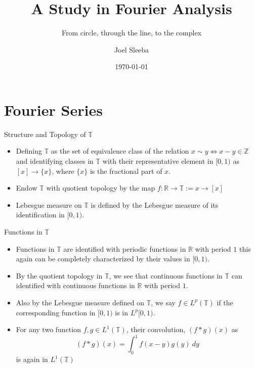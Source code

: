 \documentclass[compress]{beamer}
\title{A Study in Fourier Analysis}
\subtitle{From circle, through the line, to the complex}
\author{Joel Sleeba}
\institute{IISER Thiruvananthapuram}
\date{\today}
\newcommand{\R}{\mathbb R}
\newcommand{\T}{\mathbb T}
\begin{document}
\begin{frame}
  \maketitle
\end{frame}


\section{Fourier Series}

\begin{frame}{Structure and Topology of $\mathbb{T}$}{}
  \begin{itemize}
    \item Defining $\mathbb{T}$ as the set of equivalence class of the relation $x\sim y \iff x-y \in \mathbb{Z}$ and identifying classes in $\mathbb{T}$ with their representative element in $[0,1)$ as $[x] \to \{x\}$, where $\{x\}$ is the fractional part of $x$.
    \item Endow $\mathbb{T}$ with quotient topology by the map $f: \mathbb{R} \to \mathbb{T}:= x \to [x]$
    \item Lebesgue measure on $\mathbb{T}$ is defined by the Lebesgue measure of its identification in $[0,1)$.
  \end{itemize}
\end{frame}

\begin{frame}{Functions in $\T$}
  \begin{itemize}
    \item Functions in $\T$ are identified with periodic functions in $\R$ with period $1$ this again can be completely characterized by their values in $[0,1)$.
    \item By the quotient topology in $\T$, we see that continuous functions in $\T$ can identified with continuous functions in $\R$ with period $1$.
    \item Also by the Lebesgue measure defined on $\T$, we say $f \in L^p(\T)$ if the corresponding function in $[0, 1)$ is in $L^p[0, 1)$.
    \item For any two function $f, g \in L^1(\T)$, their convolution, $(f*g)(x)$ as $$(f*g)(x) = \int_0^1 f(x-y)g(y) \ dy$$
      is again in $L^1(\T)$
  \end{itemize}
\end{frame}
\end{document}
